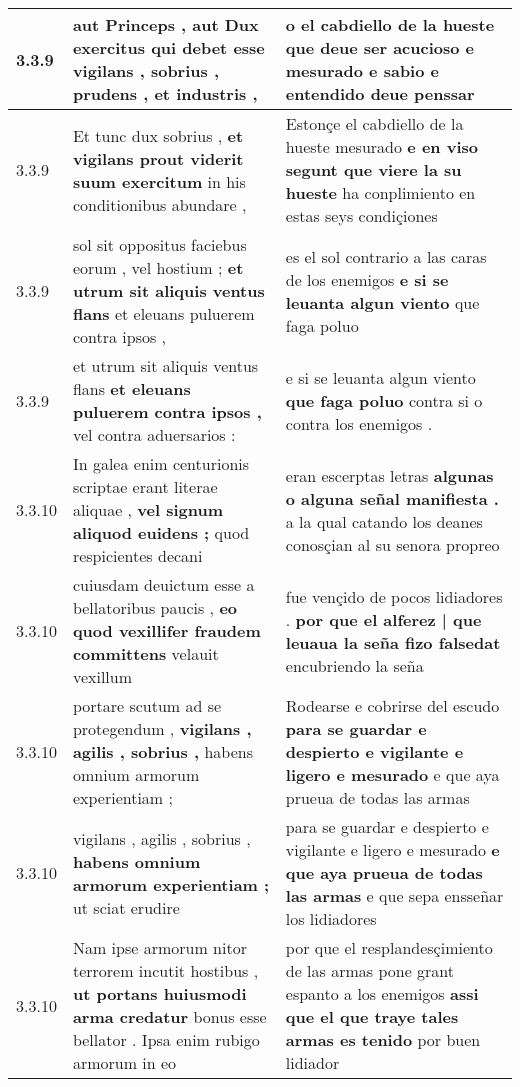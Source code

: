 \begin{tabular}{|p{1cm}|p{6.5cm}|p{6.5cm}|}
3.3.9 & aut Princeps , aut Dux exercitus \textbf{ qui debet esse vigilans , } sobrius , prudens , et industris , & o el cabdiello de la hueste \textbf{ que deue ser acucioso e mesurado e sabio e entendido } deue penssar \\\hline
3.3.9 & Et tunc dux sobrius , \textbf{ et vigilans prout viderit suum exercitum } in his conditionibus abundare , & Estonçe el cabdiello de la hueste mesurado \textbf{ e en viso segunt que viere la su hueste } ha conplimiento en estas seys condiçiones \\\hline
3.3.9 & sol sit oppositus faciebus eorum , vel hostium ; \textbf{ et utrum sit aliquis ventus flans } et eleuans puluerem contra ipsos , & es el sol contrario a las caras de los enemigos \textbf{ e si se leuanta algun viento } que faga poluo \\\hline
3.3.9 & et utrum sit aliquis ventus flans \textbf{ et eleuans puluerem contra ipsos , } vel contra aduersarios : & e si se leuanta algun viento \textbf{ que faga poluo } contra si o contra los enemigos . \\\hline
3.3.10 & In galea enim centurionis scriptae erant literae aliquae , \textbf{ vel signum aliquod euidens ; } quod respicientes decani & eran escerptas letras \textbf{ algunas o alguna señal manifiesta . } a la qual catando los deanes conosçian al su senora propreo \\\hline
3.3.10 & cuiusdam deuictum esse a bellatoribus paucis , \textbf{ eo quod vexillifer fraudem committens } velauit vexillum & fue vençido de pocos lidiadores . \textbf{ por que el alferez | que leuaua la seña fizo falsedat } encubriendo la seña \\\hline
3.3.10 & portare scutum ad se protegendum , \textbf{ vigilans , agilis , sobrius , } habens omnium armorum experientiam ; & Rodearse e cobrirse del escudo \textbf{ para se guardar e despierto e vigilante e ligero e mesurado } e que aya prueua de todas las armas \\\hline
3.3.10 & vigilans , agilis , sobrius , \textbf{ habens omnium armorum experientiam ; } ut sciat erudire & para se guardar e despierto e vigilante e ligero e mesurado \textbf{ e que aya prueua de todas las armas } e que sepa ensseñar los lidiadores \\\hline
3.3.10 & Nam ipse armorum nitor terrorem incutit hostibus , \textbf{ ut portans huiusmodi arma credatur } bonus esse bellator . Ipsa enim rubigo armorum in eo & por que el resplandesçimiento de las armas pone grant espanto a los enemigos \textbf{ assi que el que traye tales armas es tenido } por buen lidiador \\\hline

\end{tabular}
